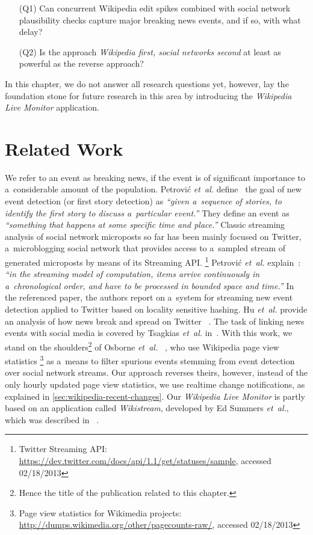 \begin{itemize}
  \itemsep0em
  \item[(Q1)] Can concurrent Wikipedia edit spikes combined with
    social network plausibility checks capture major breaking news events,
    and if so, with what delay?
  \item[(Q2)] Is the approach \emph{Wikipedia first, social networks second}
    at least as powerful as the reverse approach?
\end{itemize}

In this chapter, we do not answer all research questions yet,
however, lay the foundation stone for future research in this area
by introducing the \emph{Wikipedia Live Monitor} application.

\section{Related Work}

We refer to an event as breaking news, if the event is of significant importance
to a~considerable amount of the population.
Petrovi\'{c} \emph{et~al.} define~\cite{petrovic2010streamingfirststory}
the goal of new event detection (or first story detection) as
\textit{``given a~sequence of stories, to identify the first story
to discuss a~particular event.''}
They define an event as \textit{``something that happens
at some specific time and place.''}
Classic streaming analysis of social network microposts so far has been mainly
focused on Twitter, a~microblogging social network that provides access
to a~sampled stream of generated microposts by means of its Streaming API.%
\footnote{Twitter Streaming API:
\url{https://dev.twitter.com/docs/api/1.1/get/statuses/sample},
accessed 02/18/2013}
Petrovi\'{c} \emph{et~al.} explain~\cite{petrovic2010streamingfirststory}:
\textit{``in the streaming model of computation,
items arrive continuously in a~chronological order, and have to be
processed in bounded space and time.''}
In the referenced paper, the authors report on a~system for streaming
new event detection applied to Twitter based on locality sensitive hashing.
Hu \emph{et~al.} provide an analysis of how news break and spread on Twitter~%
\cite{hu2012breakingnews}.
The task of linking news events with social media is covered by Tsagkias
\emph{et~al.} in~\cite{tsagkias2011linkingonlinenews}.
With this work, we stand on the shoulders\footnote{Hence the title of the publication related to this chapter.}
of Osborne \emph{et~al.}~%
\cite{osborne2012bieber}, who use Wikipedia page view statistics%
\footnote{Page view statistics for Wikimedia projects:
\url{http://dumps.wikimedia.org/other/pagecounts-raw/},
accessed 02/18/2013}
as a~means to filter spurious events
stemming from event detection over social network streams.
Our approach reverses theirs, however, instead of the only hourly updated
page view statistics, we use realtime change notifications,
as explained in \autoref{sec:wikipedia-recent-changes}.
Our \emph{Wikipedia Live Monitor} is partly based on an application called
\emph{Wikistream}, developed by Ed Summers \emph{et~al.}, which was described in~%
\cite{summers2011odetonode}.


